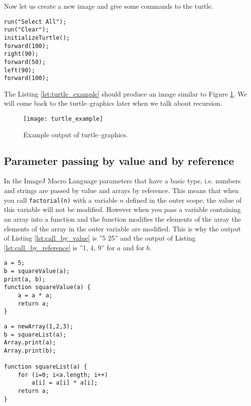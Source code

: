 Now let us create a new image and give some commands to the turtle. 

\begin{listing}[H]
\begin{verbatim} 
run("Select All");
run("Clear");
initializeTurtle();
forward(100);
right(90);
forward(50);
left(90);
forward(100);
\end{verbatim}
\caption{Implementation of the three turtle--graphics commands.}
\label{lst:turtle_example} 
\end{listing}

The Listing \ref{lst:turtle_example} should produce an image similar to Figure \ref{fig:turtle_example}. We will come back to the turtle--graphics later when we talk about recursion.

\begin{figure}[h!]
  \centering
    \texttt{[image: turtle\_example]}
    \caption[Example output of turtle--graphics]{Example output of turtle--graphics.}
    \label{fig:turtle_example}
\end{figure}

\subsection{Parameter passing by value and by reference}

In the ImageJ Macro Language parameters that have a basic type, i.e. numbers and strings are passed by value and arrays by reference. This means that when you call {\tt factorial(n)} with a variable $n$ defined in the outer scope, the value of this variable will not be modified. However when you pass a variable containing an array into a function and the function modifies the elements of the array the elements of the array in the outer variable are modified. This is why the output of Listing \ref{lst:call_by_value} is ''5 25'' and the output of Listing \ref{lst:call_by_reference} is ''1, 4, 9'' for $a$ and for $b$.  

\begin{listing}[H]
\begin{verbatim} 
a = 5;
b = squareValue(a);
print(a, b);
function squareValue(a) {
	a = a * a;
	return a;
}
\end{verbatim}
\caption{The output is ''5 25''; The $a$ in the outer context is not modified by the commands in the function.}
\label{lst:call_by_value} 
\end{listing}

\begin{listing}[H]
\begin{verbatim} 
a = newArray(1,2,3);
b = squareList(a);
Array.print(a);
Array.print(b);

function squareList(a) {
	for (i=0; i<a.length; i++)
		a[i] = a[i] * a[i];
	return a;
}
\end{verbatim}
\caption{The output is two times ''1, 4, 9''; The $a$ in the outer context is modified by the commands in the function.}
\label{lst:call_by_reference} 
\end{listing}



